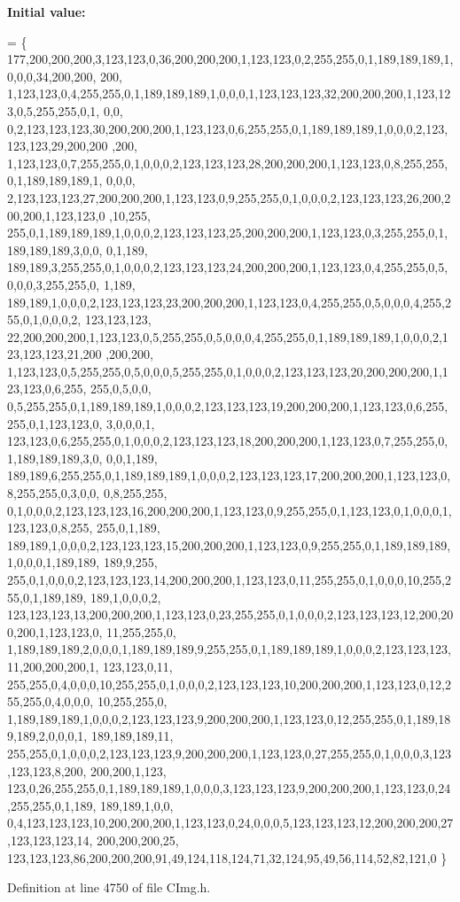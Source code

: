 {\bfseries Initial value\+:}
\begin{DoxyCode}
= \{
      177,200,200,200,3,123,123,0,36,200,200,200,1,123,123,0,2,255,255,0,1,189,189,189,1,0,0,0,34,200,200,
      200,
      1,123,123,0,4,255,255,0,1,189,189,189,1,0,0,0,1,123,123,123,32,200,200,200,1,123,123,0,5,255,255,0,1,
      0,0,
      0,2,123,123,123,30,200,200,200,1,123,123,0,6,255,255,0,1,189,189,189,1,0,0,0,2,123,123,123,29,200,200
      ,200,
      1,123,123,0,7,255,255,0,1,0,0,0,2,123,123,123,28,200,200,200,1,123,123,0,8,255,255,0,1,189,189,189,1,
      0,0,0,
      2,123,123,123,27,200,200,200,1,123,123,0,9,255,255,0,1,0,0,0,2,123,123,123,26,200,200,200,1,123,123,0
      ,10,255,
      255,0,1,189,189,189,1,0,0,0,2,123,123,123,25,200,200,200,1,123,123,0,3,255,255,0,1,189,189,189,3,0,0,
      0,1,189,
      189,189,3,255,255,0,1,0,0,0,2,123,123,123,24,200,200,200,1,123,123,0,4,255,255,0,5,0,0,0,3,255,255,0,
      1,189,
      189,189,1,0,0,0,2,123,123,123,23,200,200,200,1,123,123,0,4,255,255,0,5,0,0,0,4,255,255,0,1,0,0,0,2,
      123,123,123,
      22,200,200,200,1,123,123,0,5,255,255,0,5,0,0,0,4,255,255,0,1,189,189,189,1,0,0,0,2,123,123,123,21,200
      ,200,200,
      1,123,123,0,5,255,255,0,5,0,0,0,5,255,255,0,1,0,0,0,2,123,123,123,20,200,200,200,1,123,123,0,6,255,
      255,0,5,0,0,
      0,5,255,255,0,1,189,189,189,1,0,0,0,2,123,123,123,19,200,200,200,1,123,123,0,6,255,255,0,1,123,123,0,
      3,0,0,0,1,
      123,123,0,6,255,255,0,1,0,0,0,2,123,123,123,18,200,200,200,1,123,123,0,7,255,255,0,1,189,189,189,3,0,
      0,0,1,189,
      189,189,6,255,255,0,1,189,189,189,1,0,0,0,2,123,123,123,17,200,200,200,1,123,123,0,8,255,255,0,3,0,0,
      0,8,255,255,
      0,1,0,0,0,2,123,123,123,16,200,200,200,1,123,123,0,9,255,255,0,1,123,123,0,1,0,0,0,1,123,123,0,8,255,
      255,0,1,189,
      189,189,1,0,0,0,2,123,123,123,15,200,200,200,1,123,123,0,9,255,255,0,1,189,189,189,1,0,0,0,1,189,189,
      189,9,255,
      255,0,1,0,0,0,2,123,123,123,14,200,200,200,1,123,123,0,11,255,255,0,1,0,0,0,10,255,255,0,1,189,189,
      189,1,0,0,0,2,
      123,123,123,13,200,200,200,1,123,123,0,23,255,255,0,1,0,0,0,2,123,123,123,12,200,200,200,1,123,123,0,
      11,255,255,0,
      1,189,189,189,2,0,0,0,1,189,189,189,9,255,255,0,1,189,189,189,1,0,0,0,2,123,123,123,11,200,200,200,1,
      123,123,0,11,
      255,255,0,4,0,0,0,10,255,255,0,1,0,0,0,2,123,123,123,10,200,200,200,1,123,123,0,12,255,255,0,4,0,0,0,
      10,255,255,0,
      1,189,189,189,1,0,0,0,2,123,123,123,9,200,200,200,1,123,123,0,12,255,255,0,1,189,189,189,2,0,0,0,1,
      189,189,189,11,
      255,255,0,1,0,0,0,2,123,123,123,9,200,200,200,1,123,123,0,27,255,255,0,1,0,0,0,3,123,123,123,8,200,
      200,200,1,123,
      123,0,26,255,255,0,1,189,189,189,1,0,0,0,3,123,123,123,9,200,200,200,1,123,123,0,24,255,255,0,1,189,
      189,189,1,0,0,
      0,4,123,123,123,10,200,200,200,1,123,123,0,24,0,0,0,5,123,123,123,12,200,200,200,27,123,123,123,14,
      200,200,200,25,
      123,123,123,86,200,200,200,91,49,124,118,124,71,32,124,95,49,56,114,52,82,121,0 \}
\end{DoxyCode}


Definition at line 4750 of file C\+Img.\+h.

